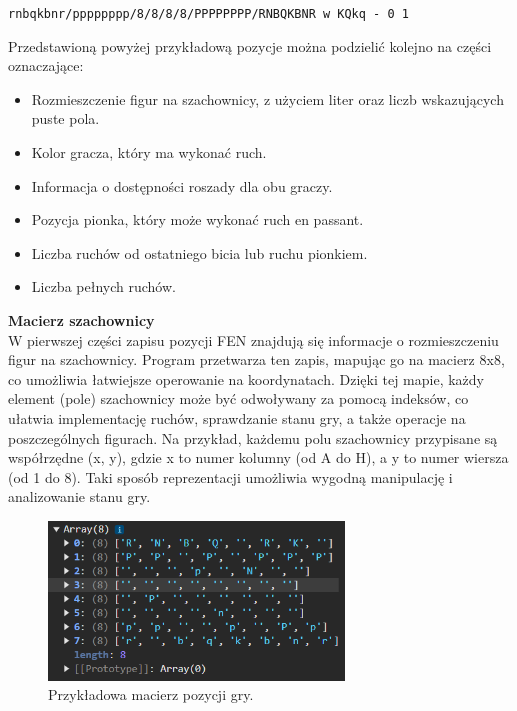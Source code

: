 \documentclass[12pt,a4paper]{article}
\begin{document}
\begin{center}
    \texttt{rnbqkbnr/pppppppp/8/8/8/8/PPPPPPPP/RNBQKBNR w KQkq - 0 1}
\end{center}


\noindent
Przedstawioną powyżej przykładową pozycje można podzielić kolejno na części oznaczające:

\begin{itemize}
    \item Rozmieszczenie figur na szachownicy, z użyciem liter oraz liczb wskazujących puste pola.
    \item Kolor gracza, który ma wykonać ruch.
    \item Informacja o dostępności roszady dla obu graczy.
    \item Pozycja pionka, który może wykonać ruch en passant.
    \item Liczba ruchów od ostatniego bicia lub ruchu pionkiem.
    \item Liczba pełnych ruchów.
\end{itemize}

\noindent \textbf{Macierz szachownicy}\\
W pierwszej części zapisu pozycji FEN znajdują się informacje o rozmieszczeniu figur na szachownicy. Program przetwarza ten zapis, mapując go na macierz 8x8, co umożliwia łatwiejsze operowanie na koordynatach. Dzięki tej mapie, każdy element (pole) szachownicy może być odwoływany za pomocą indeksów, co ułatwia implementację ruchów, sprawdzanie stanu gry, a także operacje na poszczególnych figurach. Na przykład, każdemu polu szachownicy przypisane są współrzędne (x, y), gdzie x to numer kolumny (od A do H), a y to numer wiersza (od 1 do 8). Taki sposób reprezentacji umożliwia wygodną manipulację i analizowanie stanu gry.

\vspace{0.5cm}
\begin{figure}[h!]
    \centering
    \includegraphics[width=0.7\textwidth]{images/ex_matrix.png}
    \caption{Przykładowa macierz pozycji gry.}
\end{figure}
\end{document}
